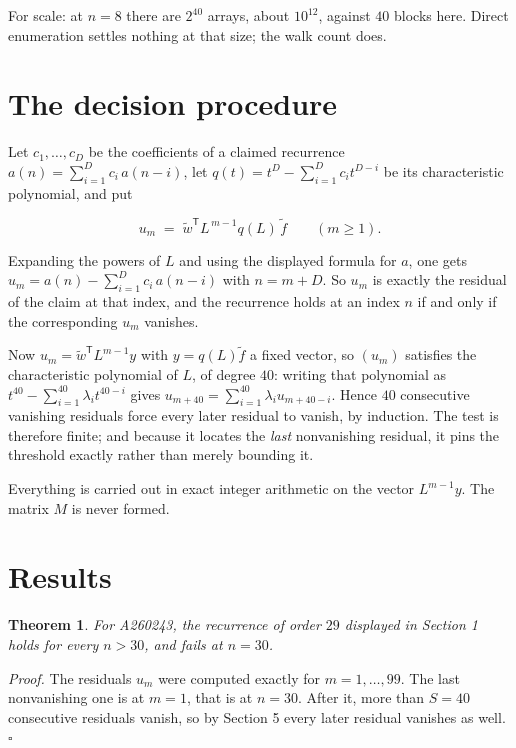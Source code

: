 \documentclass[11pt]{article}
\newtheorem{theorem}{Theorem}
\theoremstyle{definition}
\begin{document}
For scale: at $n = 8$ there are $2^{40}$ arrays, about $10^{12}$, against $40$ blocks here. Direct enumeration settles nothing at that size; the walk count does.

\section{The decision procedure}

Let $c_1,\dots,c_D$ be the coefficients of a claimed recurrence $a(n) = \sum_{i=1}^{D} c_i\,a(n-i)$, let $q(t) = t^{D} - \sum_{i=1}^{D} c_i t^{D-i}$ be its characteristic polynomial, and put

\[u_m \;=\; \tilde w^{\mathsf T} L^{\,m-1} q(L)\,\tilde f \qquad (m \ge 1).\]

Expanding the powers of $L$ and using the displayed formula for $a$, one gets $u_m = a(n) - \sum_{i=1}^{D} c_i\,a(n-i)$ with $n = m + D$. So $u_m$ is exactly the residual of the claim at that index, and the recurrence holds at an index $n$ if and only if the corresponding $u_m$ vanishes.

Now $u_m = \tilde w^{\mathsf T} L^{m-1} y$ with $y = q(L)\tilde f$ a fixed vector, so $(u_m)$ satisfies the characteristic polynomial of $L$, of degree $40$: writing that polynomial as $t^{40} - \sum_{i=1}^{40} \lambda_i t^{40-i}$ gives $u_{m+40} = \sum_{i=1}^{40} \lambda_i u_{m+40-i}$. Hence $40$ consecutive vanishing residuals force every later residual to vanish, by induction. The test is therefore finite; and because it locates the {\itshape last} nonvanishing residual, it pins the threshold exactly rather than merely bounding it.

Everything is carried out in exact integer arithmetic on the vector $L^{m-1}y$. The matrix $M$ is never formed.

\section{Results}

\begin{theorem} For A260243, the recurrence of order $29$ displayed in Section 1 holds for every $n > 30$, and fails at $n = 30$.\end{theorem}

{\itshape Proof.} The residuals $u_m$ were computed exactly for $m = 1,\dots,99$. The last nonvanishing one is at $m = 1$, that is at $n = 30$. After it, more than $S = 40$ consecutive residuals vanish, so by Section 5 every later residual vanishes as well. $\square$
\end{document}
